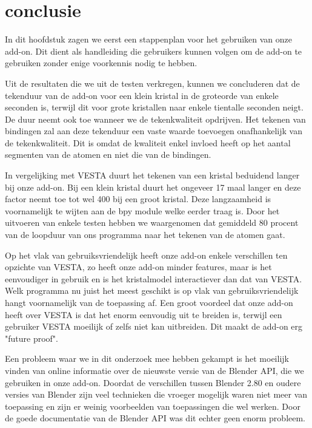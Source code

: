 \section{conclusie}
In dit hoofdstuk zagen we eerst een stappenplan voor het gebruiken van onze add-on. Dit dient als handleiding die gebruikers kunnen volgen om de add-on te gebruiken zonder enige voorkennis nodig te hebben. 
\par
Uit de resultaten die we uit de testen verkregen, kunnen we concluderen dat de tekenduur van de add-on voor een klein kristal in de groteorde van enkele seconden is, terwijl dit voor grote kristallen naar enkele tientalle seconden neigt. De duur neemt ook toe wanneer we de tekenkwaliteit opdrijven. Het tekenen van bindingen zal aan deze tekenduur een vaste waarde toevoegen onafhankelijk van de tekenkwaliteit. Dit is omdat de kwaliteit enkel invloed heeft op het aantal segmenten van de atomen en niet die van de bindingen.
\par    
In vergelijking met VESTA duurt het tekenen van een kristal beduidend langer bij onze add-on. Bij een klein kristal duurt het ongeveer 17 maal langer en deze factor neemt toe tot wel 400 bij een groot kristal. Deze langzaamheid is voornamelijk te wijten aan de bpy module welke eerder traag is. Door het uitvoeren van enkele testen hebben we waargenomen dat gemiddeld 80 procent van de loopduur van ons programma naar het tekenen van de atomen gaat. 
\par
Op het vlak van gebruiksvriendelijk heeft onze add-on enkele verschillen ten opzichte van VESTA, zo heeft onze add-on minder features, maar is het eenvoudiger in gebruik en is het kristalmodel interactiever dan dat van VESTA. Welk programma nu juist het meest geschikt is op vlak van gebruiksvriendelijk hangt voornamelijk van de toepassing af. Een groot voordeel dat onze add-on heeft over VESTA is dat het enorm eenvoudig uit te breiden is, terwijl een gebruiker VESTA moeilijk of zelfs niet kan uitbreiden. Dit maakt de add-on erg "future proof".
\par 
Een probleem waar we in dit onderzoek mee hebben gekampt is het moeilijk vinden van online informatie over de nieuwste versie van de Blender API, die we gebruiken in onze add-on. Doordat de verschillen tussen Blender 2.80 en oudere versies van Blender zijn veel technieken die vroeger mogelijk waren niet meer van toepassing en zijn er weinig voorbeelden van toepassingen die wel werken. Door de goede documentatie van de Blender API was dit echter geen enorm probleem.
\par
